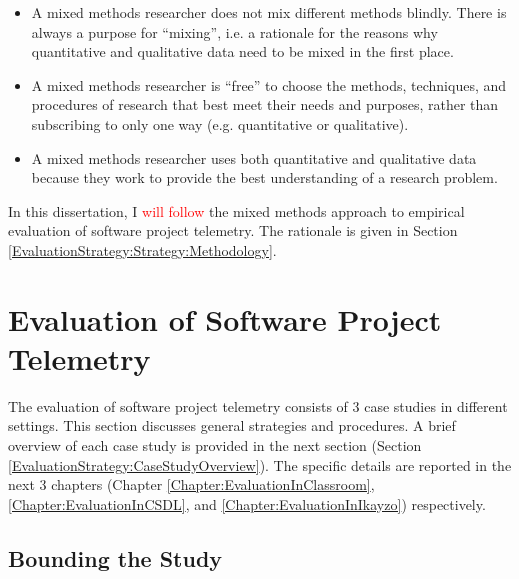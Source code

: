 \begin{itemize}
	
	\item A mixed methods researcher does not mix different methods blindly. There is always a purpose for ``mixing'', i.e. a rationale for the reasons why quantitative and qualitative data need to be mixed in the first place. 
	
	\item A mixed methods researcher is ``free'' to choose the methods, techniques, and procedures of research that best meet their needs and purposes, rather than subscribing to only one way (e.g. quantitative or qualitative).
	
	\item A mixed methods researcher uses both quantitative and qualitative data because they work to provide the best understanding of a research problem. 
	
\end{itemize}


In this dissertation, I \textcolor{red}{will follow} the mixed methods approach to empirical evaluation of software project telemetry. The rationale is given in Section \ref{EvaluationStrategy:Strategy:Methodology}.



%
%


\section{Evaluation of Software Project Telemetry} \label{EvaluationStrategy:Strategy}

The evaluation of software project telemetry consists of 3 case studies in different settings. This section discusses general strategies and procedures. 
A brief overview of each case study is provided in the next section (Section \ref{EvaluationStrategy:CaseStudyOverview}). 
The specific details are reported in the next 3 chapters (Chapter \ref{Chapter:EvaluationInClassroom}, \ref{Chapter:EvaluationInCSDL}, and \ref{Chapter:EvaluationInIkayzo}) respectively.


\subsection{Bounding the Study}

